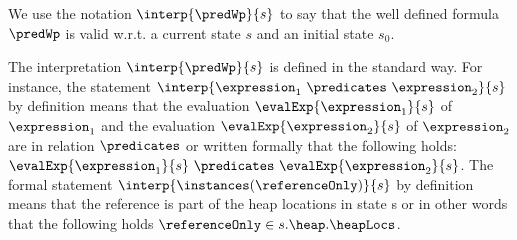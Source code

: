 We use the notation $\interp{\predWp}{s}$ to say that the well defined
  formula  $\predWp$ is valid w.r.t. a current state
  $s$ and an initial state $s_0$.

The interpretation $\interp{\predWp}{s}$ is defined in the standard way.
 For instance, the statement $\interp{\expression_1 \  \predicates \  \expression_2 }{s}$
 by definition means that the evaluation   $\evalExp{ \expression_1 }{s } $ of $\expression_1$ and the evaluation $\evalExp{ \expression_2 }{s } $ of $\expression_2$
 are in relation $ \predicates$ or written formally that the following holds:
 $\evalExp{ \expression_1 }{s } \ \predicates \ \evalExp{ \expression_2 }{s}$.
 The formal statement   $\interp{\instances(\referenceOnly)}{s}$  by definition means that the reference  is part of the heap locations in state s or in other words 
 that the following holds  $\referenceOnly \in s.\heap.\heapLocs $.

 




